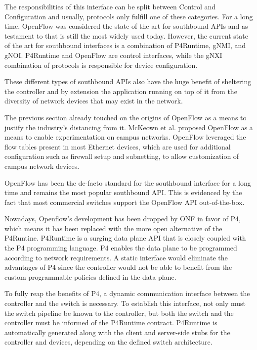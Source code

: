 The responsibilities of this interface can be split between Control and Configuration\cite{peterson_software-defined_2021} and usually, protocols only fulfill one of these categories. For a long time, OpenFlow was considered the state of the art for southbound APIs and as testament to that is still the most widely used today\cite{latif_comprehensive_2020}. However, the current state of the art for southbound interfaces is a combination of P4Runtime, gNMI, and gNOI. P4Runtime and OpenFlow are control interfaces, while the gNXI combination of protocols is responsible for device configuration\cite{peterson_software-defined_2021}.

These different types of southbound APIs also have the huge benefit of sheltering the controller and by extension the application running on top of it from the diversity of network devices that may exist in the network. \cite{peterson_software-defined_2021}

The previous section already touched on the origins of OpenFlow as a means to justify the industry's distancing from it. McKeown et al. proposed OpenFlow\cite{McKeown et al.} as a means to enable experimentation on campus networks. OpenFlow leveraged the flow tables present in most Ethernet devices, which are used for additional configuration such as firewall setup and subnetting, to allow customization of campus network devices. \cite{xia_survey_2015}

OpenFlow has been the de-facto standard for the southbound interface for a long time\cite{nunes_survey_2014} and remains the most popular southbound API. This is evidenced by the fact that most commercial switches support the OpenFlow API out-of-the-box\cite{kreutz_software-defined_2015}.

Nowadays, Openflow’s development has been dropped by ONF in favor of P4, which means it has been replaced with the more open alternative of the P4Runtine. P4Runtime is a surging data plane API\cite{hauser_survey_2021} that is closely coupled with the P4 programming language. P4 enables the data plane to be programmed according to network requirements. A static interface would eliminate the advantages of P4 since the controller would not be able to benefit from the custom programmable policies defined in the data plane. 

To fully reap the benefits of P4, a dynamic communication interface between the controller and the switch is necessary\cite{peterson_software-defined_2021}. To establish this interface, not only must the switch pipeline be known to the controller, but both the switch and the controller must be informed of the P4Runtime contract. P4Runtime is automatically generated along with the client and server-side stubs for the controller and devices, depending on the defined switch architecture\cite{peterson_software-defined_2021}.

